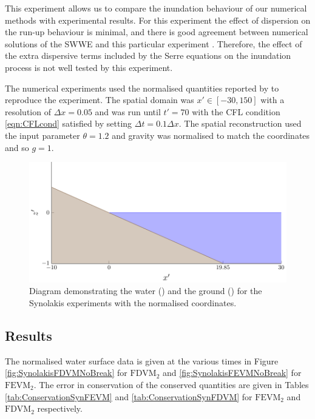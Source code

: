 This experiment allows us to compare the inundation behaviour of our numerical methods with experimental results. For this experiment the effect of dispersion on the run-up behaviour is minimal, and there is good agreement between numerical solutions of the SWWE and this particular experiment \cite{Bollermann-etal-2011-271}. Therefore, the effect of the extra dispersive terms included by the Serre equations on the inundation process is not well tested by this experiment. 

The numerical experiments used the normalised quantities reported by \citet{Synolakis-1987-523} to reproduce the experiment. The spatial domain was $x' \in [-30,150]$ with a resolution of $\Delta x = 0.05$ and was run until $t' = 70$ with the CFL condition \eqref{eqn:CFLcond} satisfied by setting $\Delta t = 0.1 \Delta x$. The spatial reconstruction used the input parameter $\theta = 1.2$ and gravity was normalised to match the coordinates and so $g= 1$.


\begin{figure}
	\centering
	\includegraphics[width=\textwidth]{./chp6/figures/Experiment/Synolakis/WavetankArtifical.pdf}
	\caption{Diagram demonstrating the water () and the ground  () for the Synolakis experiments with the normalised coordinates.}
	\label{fig:SynolakisWT}
\end{figure}

\subsection{Results}




The normalised water surface data is given at the various times in Figure \ref{fig:SynolakisFDVMNoBreak} for $\text{FDVM}_2$ and \ref{fig:SynolakisFEVMNoBreak} for $\text{FEVM}_2$. The error in conservation of the conserved quantities are given in Tables \ref{tab:ConservationSynFEVM} and \ref{tab:ConservationSynFDVM} for $\text{FEVM}_2$ and $\text{FDVM}_2$ respectively. 

